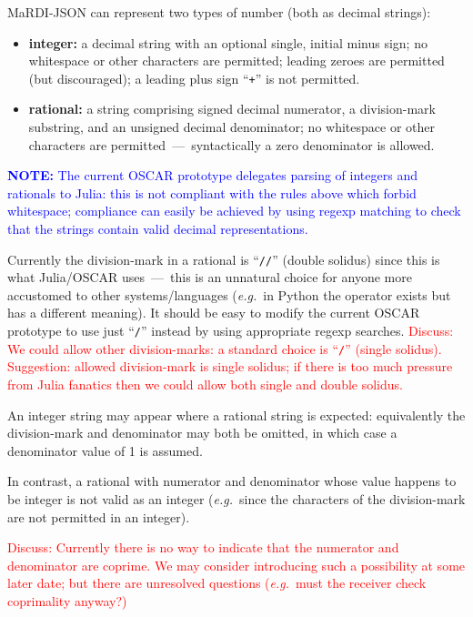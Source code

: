 \documentclass{article}
\newcommand{\MaRDIJSON}{MaRDI-JSON}
\newcommand \eg {\textit{e.g.}}
\def\red#1{\textcolor{red}{#1}}
\def\blue#1{\textcolor{blue}{#1}}
\begin{document}
{\MaRDIJSON} can represent two types of number (both as decimal strings):
\begin{itemize}
  \setlength{\itemsep}{1pt}
\item \textbf{integer:} a decimal string with an optional single, initial minus sign; no whitespace or other characters are permitted; leading zeroes are permitted (but discouraged); a leading plus sign ``\verb|+|'' is not permitted.
\item \textbf{rational:} a string comprising signed decimal numerator,
  a division-mark substring, and an unsigned decimal denominator; no
  whitespace or other characters are permitted~---~syntactically a zero
 denominator is allowed.
\end{itemize}

\blue{\textbf{NOTE:} The current OSCAR prototype delegates parsing of integers and rationals
to Julia: this is not compliant with the rules above which forbid whitespace; compliance can easily be achieved by using regexp matching to check that the strings contain valid decimal representations.}

Currently the division-mark in a rational is ``\texttt{//}'' (double
solidus) since this is what Julia/OSCAR uses~---~this is an unnatural
choice for anyone more accustomed to other systems/languages (\eg~in
Python the operator exists but has a different meaning).  It should be
easy to modify the current OSCAR prototype to use just ``\texttt{/}''
instead by using appropriate regexp searches.  \red{Discuss: We could
  allow other division-marks: a standard choice is ``\texttt{/}''
  (single solidus).  Suggestion: allowed division-mark is single
  solidus; if there is too much pressure from Julia fanatics then we
  could allow both single and double solidus.}


An integer string may appear where a rational string is expected: equivalently
the division-mark and denominator may both be omitted, in which case a
denominator value of 1 is assumed.

In contrast, a rational with numerator and denominator whose value
happens to be integer is not valid as an integer (\eg~since the
characters of the division-mark are not permitted in an integer).

\red{Discuss: Currently there is no way to indicate that the numerator and denominator are coprime.
  We may consider introducing such a possibility at some later date; but there are
  unresolved questions (\eg~must the receiver check coprimality anyway?)}
\end{document}
